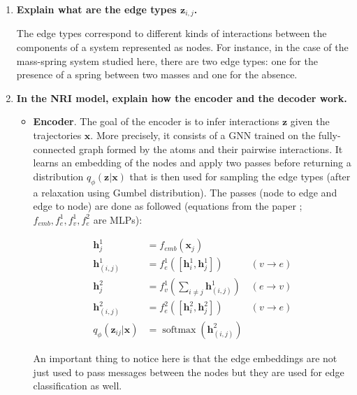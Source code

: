 \documentclass[a4paper, 11pt]{report}
\DeclareMathOperator{\softmax}{softmax}
\begin{document}
\begin{enumerate}
	\item \textbf{Explain what are the edge types $\mathbf{z}_{i,j}$.}
	
	The edge types correspond to different kinds of interactions between the components of a system represented as nodes. For instance, in the case of the mass-spring system studied here, there are two edge types: one for the presence of a spring between two masses and one for the absence.
	
	\item \textbf{In the NRI model, explain how the encoder and the decoder work.}
	
	\begin{itemize}
	    \item \textbf{Encoder}. The goal of the encoder is to infer interactions $\mathbf{z}$ given the trajectories $\mathbf{x}$. More precisely, it consists of a GNN trained on the fully-connected graph formed by the atoms and their pairwise interactions. It learns an embedding of the nodes and apply two passes before returning a distribution $q_{\phi} \left( \mathbf{z} | \mathbf{x} \right)$ that is then used for sampling the edge types (after a relaxation using Gumbel distribution). The passes (node to edge and edge to node) are done as followed (equations from the paper ; $f_{emb}, f_{e}^{1}, f_{v}^{1}, f_{e}^{2}$ are MLPs):
	    
	    \begin{equation*}
	        \begin{aligned}
	        \mathbf{h}_{j}^{1} &= f_{emb} \left( \mathbf{x}_{j} \right) \\
	        \mathbf{h}_{(i, j)}^{1} &= f_{e}^{1} \left( \left[ \mathbf{h}_{i}^{1}, \mathbf{h}_{j}^{1} \right] \right) & (v \rightarrow e) \\
	        \mathbf{h}_{j}^{2} &= f_{v}^{1} \left( \sum_{i \neq j} \mathbf{h}_{(i, j)}^{1} \right) & (e \rightarrow v) \\
	        \mathbf{h}_{(i, j)}^{2} &= f_{e}^{2} \left( \left[ \mathbf{h}_{i}^{2}, \mathbf{h}_{j}^{2} \right] \right) & (v \rightarrow e) \\
	        q_{\phi} \left( \mathbf{z}_{ij} | \mathbf{x} \right) &= \softmax \left( \mathbf{h}_{(i, j)}^{2} \right)
	        \end{aligned}
	    \end{equation*}
	    
	    An important thing to notice here is that the edge embeddings are not just used to pass messages between the nodes but they are used for edge classification as well.
	    

\end{itemize}
\end{enumerate}
\end{document}
